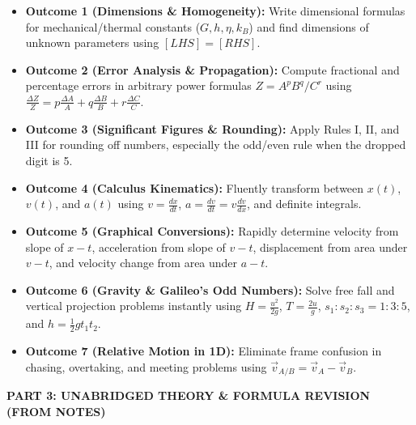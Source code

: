 \documentclass[11pt,a4paper]{article}
\begin{document}
\begin{itemize}[leftmargin=18pt,itemsep=2.5pt,topsep=1pt]
  \item[$\square$] \textbf{\textcolor{primaryDark}{Outcome 1 (Dimensions \& Homogeneity):}} Write dimensional formulas for mechanical/thermal constants ($G, h, \eta, k_B$) and find dimensions of unknown parameters using $[LHS] = [RHS]$.
  \item[$\square$] \textbf{\textcolor{primaryDark}{Outcome 2 (Error Analysis \& Propagation):}} Compute fractional and percentage errors in arbitrary power formulas $Z = A^p B^q / C^r$ using $\frac{\Delta Z}{Z} = p\frac{\Delta A}{A} + q\frac{\Delta B}{B} + r\frac{\Delta C}{C}$.
  \item[$\square$] \textbf{\textcolor{primaryDark}{Outcome 3 (Significant Figures \& Rounding):}} Apply Rules I, II, and III for rounding off numbers, especially the odd/even rule when the dropped digit is 5.
  \item[$\square$] \textbf{\textcolor{primaryDark}{Outcome 4 (Calculus Kinematics):}} Fluently transform between $x(t)$, $v(t)$, and $a(t)$ using $v = \frac{dx}{dt}$, $a = \frac{dv}{dt} = v\frac{dv}{dx}$, and definite integrals.
  \item[$\square$] \textbf{\textcolor{primaryDark}{Outcome 5 (Graphical Conversions):}} Rapidly determine velocity from slope of $x-t$, acceleration from slope of $v-t$, displacement from area under $v-t$, and velocity change from area under $a-t$.
  \item[$\square$] \textbf{\textcolor{primaryDark}{Outcome 6 (Gravity \& Galileo's Odd Numbers):}} Solve free fall and vertical projection problems instantly using $H = \frac{u^2}{2g}$, $T = \frac{2u}{g}$, $s_1:s_2:s_3 = 1:3:5$, and $h = \frac{1}{2}gt_1 t_2$.
  \item[$\square$] \textbf{\textcolor{primaryDark}{Outcome 7 (Relative Motion in 1D):}} Eliminate frame confusion in chasing, overtaking, and meeting problems using $\vec{v}_{A/B} = \vec{v}_A - \vec{v}_B$.
\end{itemize}

\vspace{5pt}

\begin{tcolorbox}[sectionbanner]
  {\large \textbf{\textsf{PART 3: UNABRIDGED THEORY \& FORMULA REVISION (FROM NOTES)}}}
\end{tcolorbox}
\vspace{4pt}
\end{document}
